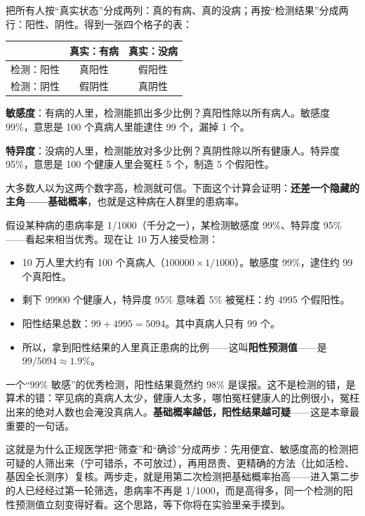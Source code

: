 \begin{qiaoliang}
把所有人按“真实状态”分成两列：真的有病、真的没病；再按“检测结果”分成两行：阳性、阴性。得到一张四个格子的表：

\begin{center}
\begin{tabular}{lcc}
\toprule
 & 真实：有病 & 真实：没病 \\
\midrule
检测：阳性 & 真阳性 & 假阳性 \\
检测：阴性 & 假阴性 & 真阴性 \\
\bottomrule
\end{tabular}
\end{center}

\textbf{敏感度}：有病的人里，检测能抓出多少比例？真阳性除以所有病人。敏感度 99\%，意思是 100 个真病人里能逮住 99 个，漏掉 1 个。

\textbf{特异度}：没病的人里，检测能放对多少比例？真阴性除以所有健康人。特异度 95\%，意思是 100 个健康人里会冤枉 5 个，制造 5 个假阳性。

大多数人以为这两个数字高，检测就可信。下面这个计算会证明：\textbf{还差一个隐藏的主角——基础概率}，也就是这种病在人群里的患病率。

假设某种病的患病率是 1/1000（千分之一），某检测敏感度 99\%、特异度 95\%——看起来相当优秀。现在让 10 万人接受检测：

\begin{itemize}[itemsep=2pt]
\item 10 万人里大约有 100 个真病人（$100000 \times 1/1000$）。敏感度 99\%，逮住约 99 个真阳性。
\item 剩下 99900 个健康人，特异度 95\% 意味着 5\% 被冤枉：约 4995 个假阳性。
\item 阳性结果总数：$99 + 4995 = 5094$。其中真病人只有 99 个。
\item 所以，拿到阳性结果的人里真正患病的比例——这叫\textbf{阳性预测值}——是 $99/5094 \approx 1.9\%$。
\end{itemize}

一个“99\% 敏感”的优秀检测，阳性结果竟然约 98\% 是误报。这不是检测的错，是算术的错：罕见病的真病人太少，健康人太多，哪怕冤枉健康人的比例很小，冤枉出来的绝对人数也会淹没真病人。\textbf{基础概率越低，阳性结果越可疑}——这是本章最重要的一句话。
\end{qiaoliang}

这就是为什么正规医学把“筛查”和“确诊”分成两步：先用便宜、敏感度高的检测把可疑的人筛出来（宁可错杀，不可放过），再用昂贵、更精确的方法（比如活检、基因全长测序）复核。两步走，就是用第二次检测把基础概率抬高——进入第二步的人已经经过第一轮筛选，患病率不再是 1/1000，而是高得多，同一个检测的阳性预测值立刻变得好看。这个思路，等下你将在实验里亲手摸到。

